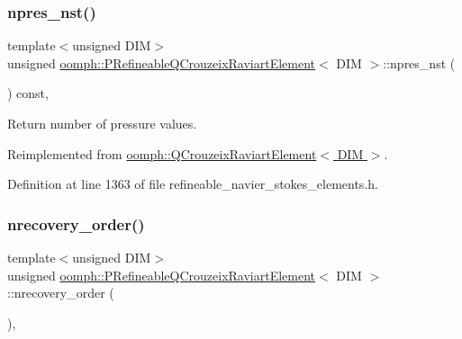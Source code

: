 \subsubsection{\texorpdfstring{npres\+\_\+nst()}{npres\_nst()}}
{\footnotesize\ttfamily template$<$unsigned D\+IM$>$ \\
unsigned \hyperlink{classoomph_1_1PRefineableQCrouzeixRaviartElement}{oomph\+::\+P\+Refineable\+Q\+Crouzeix\+Raviart\+Element}$<$ D\+IM $>$\+::npres\+\_\+nst (\begin{DoxyParamCaption}{ }\end{DoxyParamCaption}) const\hspace{0.3cm}{\ttfamily [inline]}, {\ttfamily [virtual]}}



Return number of pressure values. 



Reimplemented from \hyperlink{classoomph_1_1QCrouzeixRaviartElement_a0cbd8f1a5e0814abdbfd34ae7c58b018}{oomph\+::\+Q\+Crouzeix\+Raviart\+Element$<$ D\+I\+M $>$}.



Definition at line 1363 of file refineable\+\_\+navier\+\_\+stokes\+\_\+elements.\+h.

\mbox{\label{classoomph_1_1PRefineableQCrouzeixRaviartElement_a8a4bf8ba2d89273431c78ea5e09e0947}} 
\subsubsection{\texorpdfstring{nrecovery\+\_\+order()}{nrecovery\_order()}}
{\footnotesize\ttfamily template$<$unsigned D\+IM$>$ \\
unsigned \hyperlink{classoomph_1_1PRefineableQCrouzeixRaviartElement}{oomph\+::\+P\+Refineable\+Q\+Crouzeix\+Raviart\+Element}$<$ D\+IM $>$\+::nrecovery\+\_\+order (\begin{DoxyParamCaption}{ }\end{DoxyParamCaption})\hspace{0.3cm}{\ttfamily [inline]}, {\ttfamily [virtual]}}



